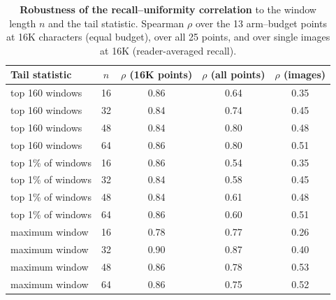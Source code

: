 \begin{table}[!htbp]
\centering
\caption{\textbf{Robustness of the recall--uniformity correlation} to the window length $n$ and the tail statistic. Spearman $\rho$ over the 13 arm--budget points at 16K characters (equal budget), over all 25 points, and over single images at 16K (reader-averaged recall).}
\label{tab:app_urobust}
\footnotesize
\begin{tabular}{l c c c c}
\toprule
Tail statistic & $n$ & $\rho$ (16K points) & $\rho$ (all points) & $\rho$ (images) \\
\midrule
top 160 windows & 16 & 0.86 & 0.64 & 0.35 \\
top 160 windows & 32 & 0.84 & 0.74 & 0.45 \\
top 160 windows & 48 & 0.84 & 0.80 & 0.48 \\
top 160 windows & 64 & 0.86 & 0.80 & 0.51 \\
top 1\% of windows & 16 & 0.86 & 0.54 & 0.35 \\
top 1\% of windows & 32 & 0.84 & 0.58 & 0.45 \\
top 1\% of windows & 48 & 0.84 & 0.61 & 0.48 \\
top 1\% of windows & 64 & 0.86 & 0.60 & 0.51 \\
maximum window & 16 & 0.78 & 0.77 & 0.26 \\
maximum window & 32 & 0.90 & 0.87 & 0.40 \\
maximum window & 48 & 0.86 & 0.78 & 0.53 \\
maximum window & 64 & 0.86 & 0.75 & 0.52 \\
\bottomrule
\end{tabular}
\end{table}
